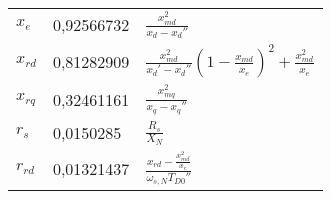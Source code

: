 \begin{longtable}[]{@{}lll@{}}
\begin{minipage}[t]{0.10\columnwidth}\raggedright
\(x_e\)\strut
\end{minipage} & \begin{minipage}[t]{0.25\columnwidth}\raggedright
0,92566732\strut
\end{minipage} & \begin{minipage}[t]{0.55\columnwidth}\raggedright
\(\frac{x_{md}^2}{x_d-x_d''}\)\strut
\end{minipage}\tabularnewline
\begin{minipage}[t]{0.10\columnwidth}\raggedright
\(x_{rd}\)\strut
\end{minipage} & \begin{minipage}[t]{0.25\columnwidth}\raggedright
0,81282909\strut
\end{minipage} & \begin{minipage}[t]{0.55\columnwidth}\raggedright
\(\frac{x_{md}^2}{x_d'-x_d''}(1-\frac{x_{md}}{x_e})^2+\frac{x_{md}^2}{x_e}\)\strut
\end{minipage}\tabularnewline
\begin{minipage}[t]{0.10\columnwidth}\raggedright
\(x_{rq}\)\strut
\end{minipage} & \begin{minipage}[t]{0.25\columnwidth}\raggedright
0,32461161\strut
\end{minipage} & \begin{minipage}[t]{0.55\columnwidth}\raggedright
\(\frac{x_{mq}^2}{x_q-x_q''}\)\strut
\end{minipage}\tabularnewline
\begin{minipage}[t]{0.10\columnwidth}\raggedright
\(r_s\)\strut
\end{minipage} & \begin{minipage}[t]{0.25\columnwidth}\raggedright
0,0150285\strut
\end{minipage} & \begin{minipage}[t]{0.55\columnwidth}\raggedright
\(\frac{R_s}{X_N}\)\strut
\end{minipage}\tabularnewline
\begin{minipage}[t]{0.10\columnwidth}\raggedright
\(r_{rd}\)\strut
\end{minipage} & \begin{minipage}[t]{0.25\columnwidth}\raggedright
0,01321437\strut
\end{minipage} & \begin{minipage}[t]{0.55\columnwidth}\raggedright
\(\frac{x_{rd}-\frac{x_{md}^2}{x_e}}{\omega_{s,N}T_{D0}''}\)\strut

\end{minipage}
\end{longtable}
